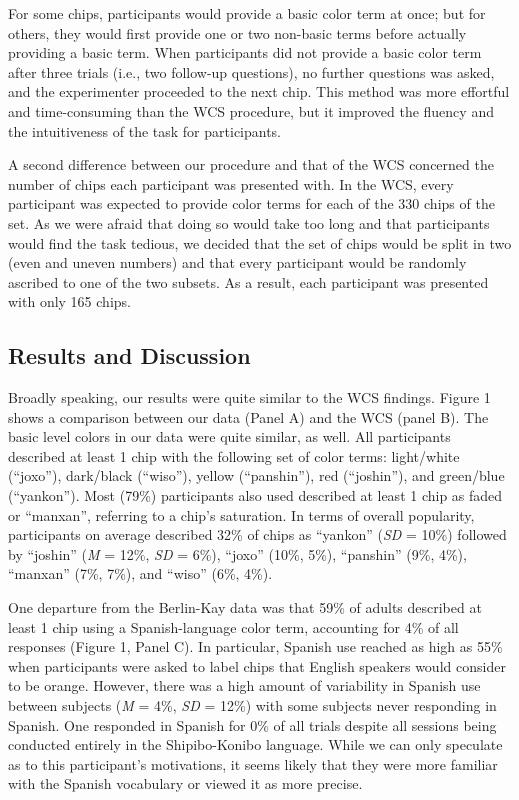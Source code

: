 \documentclass[floatsintext,man]{apa6}
\theoremstyle{definition}
\theoremstyle{definition}
\theoremstyle{definition}
\theoremstyle{remark}
\begin{document}
For some chips, participants would provide a basic color term at once;
but for others, they would first provide one or two non-basic terms
before actually providing a basic term. When participants did not
provide a basic color term after three trials (i.e., two follow-up
questions), no further questions was asked, and the experimenter
proceeded to the next chip. This method was more effortful and
time-consuming than the WCS procedure, but it improved the fluency and
the intuitiveness of the task for participants.

A second difference between our procedure and that of the WCS concerned
the number of chips each participant was presented with. In the WCS,
every participant was expected to provide color terms for each of the
330 chips of the set. As we were afraid that doing so would take too
long and that participants would find the task tedious, we decided that
the set of chips would be split in two (even and uneven numbers) and
that every participant would be randomly ascribed to one of the two
subsets. As a result, each participant was presented with only 165
chips.

\subsection{Results and Discussion}\label{results-and-discussion}

Broadly speaking, our results were quite similar to the WCS findings.
Figure 1 shows a comparison between our data (Panel A) and the WCS
(panel B). The basic level colors in our data were quite similar, as
well. All participants described at least 1 chip with the following set
of color terms: light/white (\enquote{joxo}), dark/black
(\enquote{wiso}), yellow (\enquote{panshin}), red (\enquote{joshin}),
and green/blue (\enquote{yankon}). Most (79\%) participants also used
described at least 1 chip as faded or \enquote{manxan}, referring to a
chip's saturation. In terms of overall popularity, participants on
average described 32\% of chips as \enquote{yankon} (\emph{SD} = 10\%)
followed by \enquote{joshin} (\emph{M} = 12\%, \emph{SD} = 6\%),
\enquote{joxo} (10\%, 5\%), \enquote{panshin} (9\%, 4\%),
\enquote{manxan} (7\%, 7\%), and \enquote{wiso} (6\%, 4\%).

One departure from the Berlin-Kay data was that 59\% of adults described
at least 1 chip using a Spanish-language color term, accounting for 4\%
of all responses (Figure 1, Panel C). In particular, Spanish use reached
as high as 55\% when participants were asked to label chips that English
speakers would consider to be orange. However, there was a high amount
of variability in Spanish use between subjects (\emph{M} = 4\%,
\emph{SD} = 12\%) with some subjects never responding in Spanish. One
responded in Spanish for 0\% of all trials despite all sessions being
conducted entirely in the Shipibo-Konibo language. While we can only
speculate as to this participant's motivations, it seems likely that
they were more familiar with the Spanish vocabulary or viewed it as more
precise.
\end{document}
